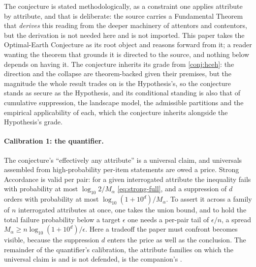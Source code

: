 \documentclass[11pt]{article}
\theoremstyle{definition}
\begin{document}
\noindent The conjecture is stated methodologically, as a constraint one applies attribute by attribute, and that is deliberate: the source \cite{Nexus} carries a Fundamental Theorem that \emph{derives} this reading from the deeper machinery of attentors and contentors, but the derivation is not needed here and is not imported. This paper takes the Optimal-Earth Conjecture as its root object and reasons forward from it; a reader wanting the theorem that grounds it is directed to the source, and nothing below depends on having it. The conjecture inherits its grade from \autoref{conj:hceh}: the direction and the collapse are theorem-backed given their premises, but the magnitude the whole result trades on is the Hypothesis's, so the conjecture stands as secure as the Hypothesis, and its conditional standing is also that of cumulative suppression, the landscape model, the admissible partitions and the empirical applicability of each, which the conjecture inherits alongside the Hypothesis's grade.

\paragraph{Calibration 1: the quantifier.} The conjecture's ``effectively any attribute'' is a universal claim, and universals assembled from high-probability per-item statements are owed a price. Strong Accordance is valid per pair: for a given interrogated attribute the inequality fails with probability at most $\log_{10} 2/M_\alpha$ \eqref{eq:strong-full}, and a suppression of $d$ orders with probability at most $\log_{10}(1 + 10^{d})/M_\alpha$. To assert it across a family of $n$ interrogated attributes at once, one takes the union bound, and to hold the total failure probability below a target $\epsilon$ one needs a per-pair tail of $\epsilon/n$, a spread $M_\alpha \ge n \log_{10}(1 + 10^{d})/\epsilon$. Here a tradeoff the paper must confront becomes visible, because the suppression $d$ enters the price as well as the conclusion. The remainder of the quantifier's calibration, the attribute families on which the universal claim is and is not defended, is the companion's \cite{Nexus}.
\end{document}
